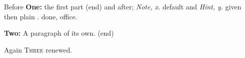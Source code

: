 \documentclass{article}
\newenvironment{piece}[1]{\textbf{#1:} }{ (end)}
\newenvironment{opt}[2][Note]{\emph{#1, #2.} }{}
\newenvironment*{plain}{}{.}
\newenvironment{nothing}{}{}
\begin{document}
Before \begin{piece}{One} the first part\end{piece} and after; \begin{opt}{x} default\end{opt}
and \begin{opt}[Hint]{y}given\end{opt} then \begin{plain} plain \end{plain} done, of\begin{nothing}f\end{nothing}ice.

\begin{piece}{Two}
A paragraph of its own.
\end{piece}

\renewenvironment{piece}[1]{\textsc{#1} }{}
Again \begin{piece}{Three}renewed\end{piece}.
\end{document}
